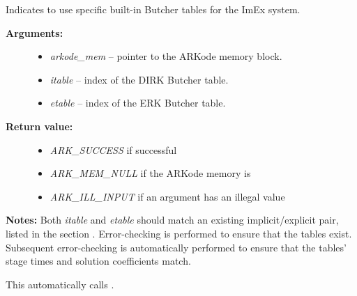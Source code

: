 \documentclass[letterpaper,10pt,english]{sphinxmanual}
\begin{document}
\begin{fulllineitems}
\label{c_interface/User_callable:c.ARKodeSetARKTableNum}
Indicates to use specific built-in Butcher tables for the ImEx system.
\begin{description}
\item[{\textbf{Arguments:}}] \leavevmode\begin{itemize}
\item {} 
\emph{arkode\_mem} -- pointer to the ARKode memory block.

\item {} 
\emph{itable} -- index of the DIRK Butcher table.

\item {} 
\emph{etable} -- index of the ERK Butcher table.

\end{itemize}

\item[{\textbf{Return value:}}] \leavevmode\begin{itemize}
\item {} 
\emph{ARK\_SUCCESS} if successful

\item {} 
\emph{ARK\_MEM\_NULL} if the ARKode memory is 

\item {} 
\emph{ARK\_ILL\_INPUT} if an argument has an illegal value

\end{itemize}

\end{description}

\textbf{Notes:} Both \emph{itable} and \emph{etable} should match an existing
implicit/explicit pair, listed in the section {\hyperref[Butcher:butcher-additive]{\emph{}}}.
Error-checking is performed to ensure that the tables exist.
Subsequent error-checking is automatically performed to ensure that
the tables' stage times and solution coefficients match.

This automatically calls {\hyperref[c_interface/User_callable:c.ARKodeSetImEx]{\emph{}}}.

\end{fulllineitems}

\end{document}
